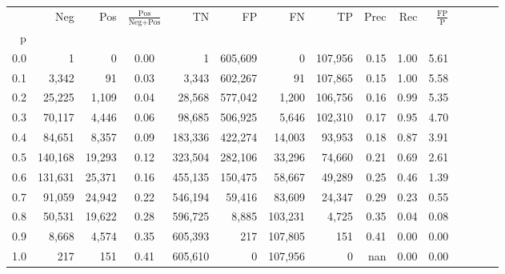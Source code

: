 \begin{tabular}{rrrcrrrrrrrrrrr}
\toprule
{} &      Neg &     Pos & $\frac{\text{Pos}}{\text{Neg}+\text{Pos}}$ &       TN &       FP &       FN &       TP &  Prec &   Rec & $\frac{\text{FP}}{\text{P}}$ \\
p   &          &         &                                            &          &          &          &          &       &       &                              \\
\midrule
0.0 &        1 &       0 &                                       0.00 &        1 &  605,609 &        0 &  107,956 &  0.15 &  1.00 &                         5.61 \\
0.1 &    3,342 &      91 &                                       0.03 &    3,343 &  602,267 &       91 &  107,865 &  0.15 &  1.00 &                         5.58 \\
0.2 &   25,225 &   1,109 &                                       0.04 &   28,568 &  577,042 &    1,200 &  106,756 &  0.16 &  0.99 &                         5.35 \\
0.3 &   70,117 &   4,446 &                                       0.06 &   98,685 &  506,925 &    5,646 &  102,310 &  0.17 &  0.95 &                         4.70 \\
0.4 &   84,651 &   8,357 &                                       0.09 &  183,336 &  422,274 &   14,003 &   93,953 &  0.18 &  0.87 &                         3.91 \\
0.5 &  140,168 &  19,293 &                                       0.12 &  323,504 &  282,106 &   33,296 &   74,660 &  0.21 &  0.69 &                         2.61 \\
0.6 &  131,631 &  25,371 &                                       0.16 &  455,135 &  150,475 &   58,667 &   49,289 &  0.25 &  0.46 &                         1.39 \\
0.7 &   91,059 &  24,942 &                                       0.22 &  546,194 &   59,416 &   83,609 &   24,347 &  0.29 &  0.23 &                         0.55 \\
0.8 &   50,531 &  19,622 &                                       0.28 &  596,725 &    8,885 &  103,231 &    4,725 &  0.35 &  0.04 &                         0.08 \\
0.9 &    8,668 &   4,574 &                                       0.35 &  605,393 &      217 &  107,805 &      151 &  0.41 &  0.00 &                         0.00 \\
1.0 &      217 &     151 &                                       0.41 &  605,610 &        0 &  107,956 &        0 &   nan &  0.00 &                         0.00 \\
\bottomrule
\end{tabular}
